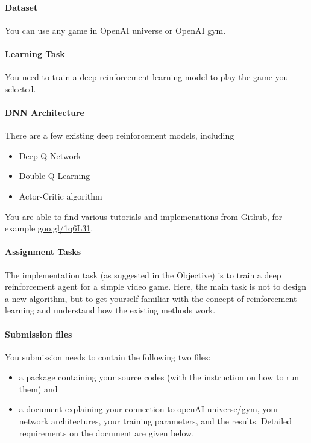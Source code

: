 \documentclass[12pt,a4]{article}
\begin{document}
\paragraph{Dataset} You can use any game in OpenAI universe or OpenAI gym.

\paragraph{Learning Task}  You need to train a deep reinforcement learning model to play the game you selected. 

\paragraph{DNN Architecture} There are a few existing deep reinforcement models, including  
\begin{itemize}
\item Deep Q-Network
\item Double Q-Learning
\item Actor-Critic algorithm 
\end{itemize} 
You are able to find various tutorials and implemenations from Github, for example \url{goo.gl/1q6L31}. 

\paragraph{Assignment Tasks} 

The implementation task (as suggested in the Objective) is to train a deep reinforcement agent for a simple video game. Here, the main task is not to design a new algorithm, but to get yourself familiar with the concept of reinforcement learning and understand how the existing methods work. 

\paragraph{Submission files} You submission needs to contain the following two files: 
\begin{itemize}

\item a package containing your source codes (with the instruction on how to run them) and 
\item a document explaining your connection to openAI universe/gym, your network architectures, your training parameters, and the results. Detailed requirements on the document are given below. 

\end{itemize}
\end{document}
